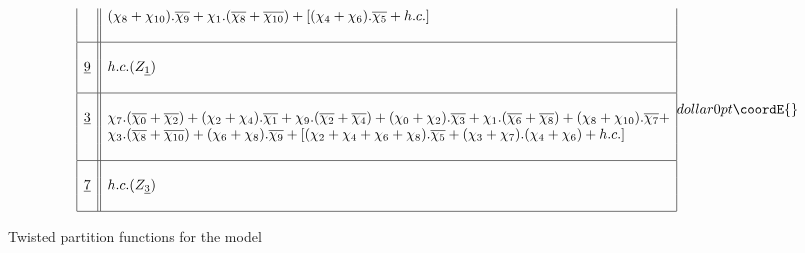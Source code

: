 \documentclass[a4paper,11pt]{article}
\providecommand{\ch}[1]{\chi_{#1}}
\providecommand{\och}[1]{\overline{\chi_{#1}}}
\providecommand{\ud}[1]{\underline{#1}}
\begin{document}
\begin{table}
$${\begin{array}{|c||l|}
{}  & (\ch{8} + \ch{10}).\och{9} + \ch{1}.(\och{8} + \och{10})+
      [(\ch{4} + \ch{6}).\och{5} + h.c.] \\
{}  &  {}  \\
\hline
{}  &  {}  \\
\ud9  &  h.c.(Z_{\ud1})  \\
{}  &  {}  \\
\hline
{}  &  {}  \\
\ud3  &  \ch{7}.(\och{0} + \och{2}) + (\ch{2} + \ch{4}).\och{1} +
          \ch{9}.(\och{2} + \och{4})+ (\ch{0} + \ch{2}).\och{3} +
          \ch{1}.(\och{6} + \och{8}) + (\ch{8} + \ch{10}).\och{7}+ \\
{}  &  \ch{3}.(\och{8} + \och{10}) + (\ch{6} + \ch{8}).\och{9} +
          [(\ch{2} + \ch{4} + \ch{6} + \ch{8}).\och{5} +
           (\ch{3} + \ch{7}).(\ch{4} + \ch{6}) + h.c.] \\
{}  &  {}  \\
\hline
{}  &  {}  \\
\ud7  &  h.c.(Z_{\ud3})  \\
{}  &  {}  \\
\hline
\end{array}
}{dollar}{0pt}\coordE{}$$
\normalsize
\caption{Twisted partition functions for the \coordHE{} model}
\end{table}




\end{document}
